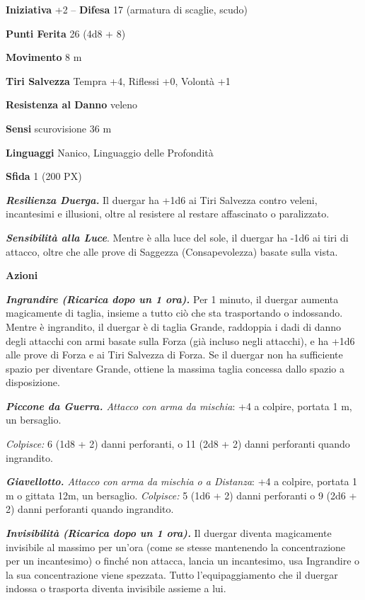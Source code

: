 \begin{multicols}{2}
	\textbf{Iniziativa} +2 -- \textbf{Difesa} 17 (armatura di scaglie, scudo)

	\textbf{Punti Ferita} 26 (4d8 + 8)

	\textbf{Movimento} 8 m

	\textbf{Tiri Salvezza} Tempra +4, Riflessi +0, Volontà +1

	\textbf{Resistenza al Danno} veleno

	\textbf{Sensi} scurovisione 36 m

	\textbf{Linguaggi} Nanico, Linguaggio delle Profondità

	\textbf{Sfida} 1 (200 PX)

	\textit{\textbf{Resilienza Duerga.}} Il duergar ha +1d6 ai Tiri Salvezza contro veleni, incantesimi e illusioni, oltre al resistere al restare affascinato o paralizzato.

	\textit{\textbf{Sensibilità alla Luce}}. Mentre è alla luce del sole, il duergar ha -1d6 ai tiri di attacco, oltre che alle prove di Saggezza (Consapevolezza) basate sulla vista.

	\textbf{Azioni}

	\textit{\textbf{Ingrandire (Ricarica dopo un 1 ora).}} Per 1 minuto, il duergar aumenta magicamente di taglia, insieme a tutto ciò che sta trasportando o indossando. Mentre è ingrandito, il duergar è di taglia Grande, raddoppia i dadi di danno degli attacchi con armi basate sulla Forza (già incluso negli attacchi), e ha +1d6 alle prove di Forza e ai Tiri Salvezza di Forza. Se il duergar non ha sufficiente spazio per diventare Grande, ottiene la massima taglia concessa dallo spazio a disposizione.

	\textit{\textbf{Piccone da Guerra.} Attacco con arma da mischia}: +4 a colpire, portata 1 m, un bersaglio.

	\textit{Colpisce:} 6 (1d8 + 2) danni perforanti, o 11 (2d8 + 2) danni perforanti quando ingrandito.

	\textit{\textbf{Giavellotto.} Attacco con arma da mischia o a Distanza}: +4 a colpire, portata 1 m o gittata 12m, un bersaglio. \textit{Colpisce:} 5 (1d6 + 2) danni perforanti o 9 (2d6 + 2) danni
	perforanti quando ingrandito.

	\textit{\textbf{Invisibilità (Ricarica dopo un 1 ora).}} Il duergar diventa magicamente invisibile al massimo per un'ora (come se stesse mantenendo la concentrazione per un incantesimo) o finché non attacca, lancia un incantesimo, usa Ingrandire o la sua concentrazione viene spezzata. Tutto l'equipaggiamento che il duergar indossa o trasporta diventa invisibile assieme a lui.


\end{multicols}
